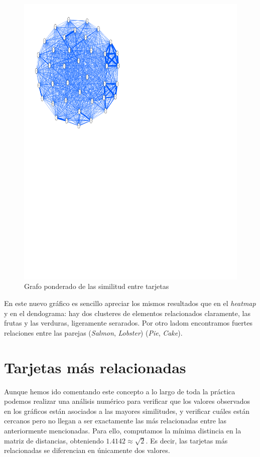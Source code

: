 \documentclass[a4paper]{article}
\begin{document}
\begin{figure}[H]
	\includegraphics[scale=.6]{figures/dist}
	\centering
	\caption{Grafo ponderado de las similitud entre tarjetas}
\end{figure}

En este nuevo gráfico es sencillo apreciar los mismos resultados que en el \emph{heatmap} y en el dendograma: hay dos clusteres de elementos relacionados claramente, las frutas y las verduras, ligeramente serarados. Por otro ladom encontramos fuertes relaciones entre las parejas (\emph{Salmon}, \emph{Lobster}) (\emph{Pie}, \emph{Cake}).

\section{Tarjetas más relacionadas}

Aunque hemos ido comentando este concepto a lo largo de toda la práctica podemos realizar una análisis numérico para verificar que los valores observados en los gráficos están asociados a las mayores similitudes, y verificar cuáles están cercanos pero no llegan a ser exactamente las más relacionadas entre las anteriormente mencionadas. Para ello, computamos la mínima distincia en la matriz de distancias, obteniendo $1.4142 \approx \sqrt{2}$. Es decir, las tarjetas más relacionadas se diferencian en únicamente dos valores. \\
\end{document}
